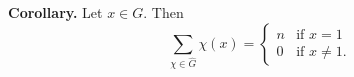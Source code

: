 \textbf{Corollary.} Let $x \in G$. Then
$$\sum_{\chi \in \hat{G}} \chi(x) = \begin{cases} n & \text{if } x = 1 \\ 0 & \text{if } x \neq 1. \end{cases}$$
